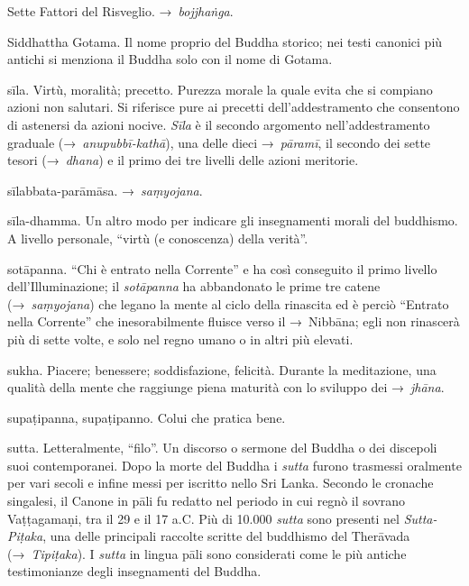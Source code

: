 \begin{glossarydescription}
\item[Sette Fattori del Risveglio.] →~\emph{bojjhaṅga}.

\item[Siddhattha Gotama.] Il nome proprio del Buddha storico; nei testi canonici
  più antichi si menziona il Buddha solo con il nome di Gotama.

\item[sīla.] Virtù, moralità; precetto. Purezza morale la quale evita che
  si compiano azioni non salutari. Si riferisce pure ai precetti
  dell'addestramento che consentono di astenersi da azioni nocive. \emph{Sīla} è
  il secondo argomento nell'addestramento graduale (→~\emph{anupubbī-kathā}),
  una delle dieci →~\emph{pāramī}, il secondo dei sette tesori (→~\emph{dhana})
  e il primo dei tre livelli delle azioni meritorie.

\item[sīlabbata-parāmāsa.] →~\emph{saṃyojana}.

\item[sīla-dhamma.] Un altro modo per indicare gli insegnamenti morali del
  buddhismo. A livello personale, ``virtù (e conoscenza) della verità''.

\item[sotāpanna.] ``Chi è entrato nella Corrente'' e ha così conseguito il
  primo livello dell'Illuminazione; il \emph{sotāpanna} ha abbandonato le prime
  tre catene (→~\emph{saṃyojana}) che legano la mente al ciclo della rinascita
  ed è perciò ``Entrato nella Corrente'' che inesorabilmente fluisce verso il
  →~Nibbāna; egli non rinascerà più di sette volte, e solo nel regno
  umano o in altri più elevati.

\item[sukha.] Piacere; benessere; soddisfazione, felicità. Durante la
  meditazione, una qualità della mente che raggiunge piena maturità con lo
  sviluppo dei →~\emph{jhāna}.

\item[supaṭipanna, supaṭipanno.] Colui che pratica bene.

\item[sutta.] Letteralmente, ``filo''. Un discorso o sermone del Buddha o
  dei discepoli suoi contemporanei. Dopo la morte del Buddha i \emph{sutta}
  furono trasmessi oralmente per vari secoli e infine messi per iscritto nello
  Sri Lanka. Secondo le cronache singalesi, il Canone in pāli fu redatto nel
  periodo in cui regnò il sovrano Vaṭṭagamaṇi, tra il 29 e il 17 a.C. Più di
  10.000 \emph{sutta} sono presenti nel \emph{Sutta-Piṭaka}, una delle
  principali raccolte scritte del buddhismo del Therāvada (→~\emph{Tipiṭaka}). I
  \emph{sutta} in lingua pāli sono considerati come le più antiche testimonianze
  degli insegnamenti del Buddha.


\end{glossarydescription}
